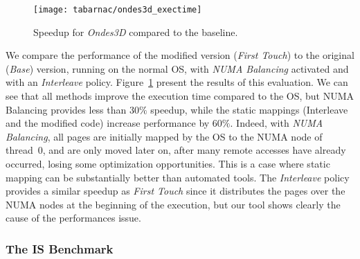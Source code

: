\begin{figure}[htb]
    \centering
    \texttt{[image: tabarnac/ondes3d\_exectime]}
    \caption{Speedup for \emph{Ondes3D} compared to the baseline.}
    \label{fig:ondes-res}
\end{figure}

We compare the performance of the modified version (\emph{First Touch}) to the
original (\emph{Base})
version, running on the normal OS, with \emph{NUMA Balancing} activated and with an
\emph{Interleave} policy. Figure~\ref{fig:ondes-res} present the results of this
evaluation. We can see that all methods improve the execution time compared to the OS, but
NUMA Balancing provides less than $30\%$ speedup, while the static mappings
(Interleave and the modified code) increase performance by $60\%$.
Indeed,
with \emph{NUMA Balancing}, all pages are initially mapped by the OS to the NUMA node
of thread~$0$, and
are only moved later on, after many remote accesses have already occurred,
losing some optimization opportunities. This is a case where static mapping can be substantially better than automated
tools. The \emph{Interleave} policy provides a similar speedup as
\emph{First Touch} since it distributes the pages over the NUMA nodes at the beginning of
the execution, but our tool shows clearly the cause of the performances issue.


\subsubsection{The IS Benchmark}

